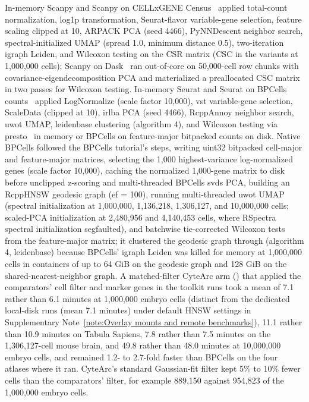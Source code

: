 In-memory Scanpy and Scanpy on CELLxGENE Census~\cite{wolf2018,cellxgene2025} applied total-count normalization, log1p transformation, Seurat-flavor variable-gene selection, feature scaling clipped at 10, ARPACK PCA (seed 4466), PyNNDescent neighbor search, spectral-initialized UMAP (spread 1.0, minimum distance 0.5), two-iteration igraph Leiden, and  Wilcoxon testing on the CSR matrix (CSC in the  variants at 1,000,000 cells); Scanpy on Dask~\cite{scanpydask} ran out-of-core on 50,000-cell row chunks with covariance-eigendecomposition PCA and materialized a preallocated CSC matrix in two passes for Wilcoxon testing. In-memory Seurat and Seurat on BPCells counts~\cite{hao2024seurat,parks2025bpcells} applied LogNormalize (scale factor 10,000), vst variable-gene selection, ScaleData (clipped at 10), irlba PCA (seed 4466), RcppAnnoy neighbor search, uwot UMAP, leidenbase clustering (algorithm 4), and Wilcoxon testing via presto~\cite{korsunsky2019presto} in memory or BPCells  on feature-major bitpacked counts on disk. Native BPCells followed the BPCells tutorial's steps, writing uint32 bitpacked cell-major and feature-major matrices, selecting the 1,000 highest-variance log-normalized genes (scale factor 10,000), caching the normalized 1,000-gene matrix to disk before unclipped z-scoring and multi-threaded BPCells svds PCA, building an RcppHNSW geodesic graph (ef = 100), running multi-threaded uwot UMAP (spectral initialization at 1,000,000, 1,136,218, 1,306,127, and 10,000,000 cells; scaled-PCA initialization at 2,480,956 and 4,140,453 cells, where RSpectra spectral initialization segfaulted), and batchwise tie-corrected Wilcoxon tests from the feature-major matrix; it clustered the geodesic graph through  (algorithm 4, leidenbase) because BPCells' igraph Leiden was killed for memory at 1,000,000 cells in containers of up to 64 GiB on the geodesic graph and 128 GiB on the shared-nearest-neighbor graph. A matched-filter CyteArc arm () that applied the comparators' cell filter and marker genes in the toolkit runs took a mean of 7.1 rather than 6.1 minutes at 1,000,000 embryo cells (distinct from the dedicated local-disk runs (mean 7.1 minutes) under default HNSW settings in Supplementary Note~\ref{note:Overlay mounts and remote benchmarks}), 11.1 rather than 10.9 minutes on Tabula Sapiens, 7.8 rather than 7.5 minutes on the 1,306,127-cell mouse brain, and 49.8 rather than 48.0 minutes at 10,000,000 embryo cells, and remained 1.2- to 2.7-fold faster than BPCells on the four atlases where it ran. CyteArc's standard Gaussian-fit filter kept 5\% to 10\% fewer cells than the comparators' filter, for example 889,150 against 954,823 of the 1,000,000 embryo cells.

